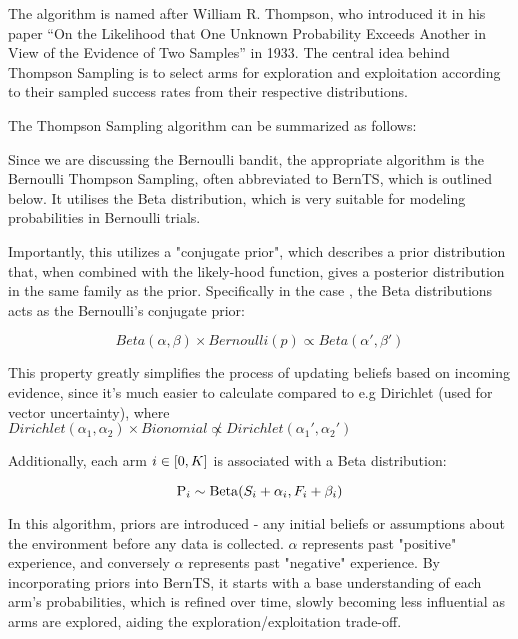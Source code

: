 The algorithm is named after William R. Thompson, who introduced it in his paper ``On the Likelihood that One Unknown Probability Exceeds Another in View of the Evidence of Two Samples'' \cite{Thompson_1933} in 1933. The central idea behind Thompson Sampling is to select arms for exploration and exploitation according to their sampled success rates from their respective distributions.

The Thompson Sampling algorithm can be summarized as follows:


Since we are discussing the Bernoulli bandit, the appropriate algorithm is the Bernoulli Thompson Sampling, often abbreviated to BernTS, which is outlined below. It utilises the Beta distribution, which is very suitable for modeling probabilities in Bernoulli trials.

Importantly, this utilizes a "conjugate prior", which describes a prior distribution that, when combined with the likely-hood function, gives a posterior distribution in the same family as the prior. Specifically in the case , the Beta distributions acts as the Bernoulli's conjugate prior:

$$Beta(\alpha,\beta) \times Bernoulli(p) \propto Beta(\alpha',\beta')$$

This property greatly simplifies the process of updating beliefs based on incoming evidence, since it's much easier to calculate compared to e.g Dirichlet (used for vector uncertainty), where $Dirichlet(\alpha_1,\alpha_2) \times Bionomial \not\propto Dirichlet(\alpha_1',\alpha_2')$

Additionally, each arm $i \in [0, K]$ is associated with a Beta distribution:

$$\mathrm{P}_{i} \sim \mathrm{Beta}(S_i + \alpha_i, F_i + \beta_i)$$

In this algorithm, priors are introduced - any initial beliefs or assumptions about the environment before any data is collected. $\alpha$ represents past "positive" experience, and conversely $\alpha$ represents past "negative" experience. By incorporating priors into BernTS, it starts with a base understanding of each arm's probabilities, which is refined over time, slowly becoming less influential as arms are explored, aiding the exploration/exploitation trade-off.

